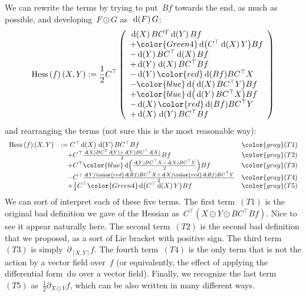 We can rewrite the terms by trying to put~$Bf$ towards the end, as much as
possible, and developing~$F\odot G$ as~$\,\mathrm{d}\!\left(F\right)G$:
\begin{equation*}
	\mathrm{Hess}\left(f\right)(X,Y) :=
	\frac12C^\top\left(
		\begin{array}{l}
			\diag{X}BC^T\diag{Y}Bf\\
			+{\color{Green4}\diag{C^\top\diag{X}Y}}Bf\\
			-\diag{Y}BC^\top\diag{X}Bf\\
			+\diag{Y}\diag{X}BC^\top Bf\\
			-\diag{Y}{\color{red}\diag{Bf}}BC^\top X\\
			-{\color{blue}\diag{\diag{X}BC^\top Y}}Bf\\
			+{\color{blue}\diag{\diag{Y}BC^\top X}}Bf\\
			-\diag{X}{\color{red}\diag{Bf}}BC^\top Y\\
			+\diag{X}\diag{Y}BC^\top Bf
		\end{array}
	\right)
\end{equation*}
and rearranging the terms (not sure this is the most reasonable way):
\begin{equation*}
	\begin{array}{lll}
		\mathrm{Hess}\left(f\right)(X,Y) & :=
		C^\top\diag{X}\diag{Y}BC^\top Bf &{\color{gray}
		\small(T1)}\\
		&\quad +C^\top\frac{\diag{X}BC^T\diag{Y}+\diag{Y}BC^\top\diag{X}}2Bf &{\color{gray}
		\small(T2)}\\
		&\quad +C^\top{\color{blue}\diag{\frac{
			{\diag{Y}BC^\top X}-\diag{X}BC^\top Y}2
	}}Bf &{\color{gray}
	\small(T3)}\\
		&\quad -C^\top\frac{\diag{Y}{\color{red}\diag{Bf}}BC^\top X
			+\diag{X}{\color{red}\diag{Bf}}BC^\top Y
		}2 &{\color{gray}
		\small(T4)}\\
		&\quad +\frac12 C^\top{\color{Green4}\diag{C^\top\diag{X}Y}}Bf &{\color{gray}
		\small(T5)}\\
	\end{array}
\end{equation*}
We can sort of interpret each of these five terms.  The first term~$(T1)$ is
the original bad definition we gave of the Hessian as~$C^\top(X\odot Y\odot
BC^\top Bf)$.  Nice to see it appear naturally here.  The second term~$(T2)$
is the second bad definition that we proposed, as a sort of Lie bracket with
positive sign.  The third term~$(T3)$ is simply~$\partial_{[X,Y]} f$.  The
fourth term~$(T4)$ is the only term that is not the action by a vector field
over~$f$ (or equivalently, the effect of applying the differential
form~$\mathrm{d}u$ over a vector field).  Finally, we recognize the last
term~$(T5)$ as~$\frac12\partial_{X\odot Y}f$, which can be also written in
many different ways.

